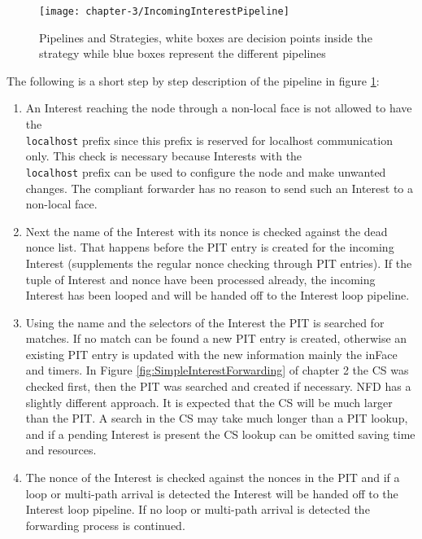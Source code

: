 \vspace{5mm} %

\begin{figure}[H]
  \centering
  \texttt{[image: chapter-3/IncomingInterestPipeline]}
  \caption{Pipelines and Strategies, white boxes are decision points inside the strategy while blue boxes represent the different pipelines \cite{Afanasyev16}}
  \label{fig:IncomingInterestPipeline}
\end{figure}

\vspace{5mm} %

The following is a short step by step description of the pipeline in figure  \ref{fig:IncomingInterestPipeline}:

\begin{enumerate}
\item An Interest reaching the node through a non-local face is not allowed to have the \texttt{\\localhost} prefix since this prefix is reserved for localhost communication only. This check is necessary because Interests with the \texttt{\\localhost} prefix can be used to configure the node and make unwanted changes. The compliant forwarder has no reason to send such an Interest to a non-local face.
\item Next the name of the Interest with its nonce is checked against the dead nonce list. That happens before the PIT entry is created for the incoming Interest (supplements the regular nonce checking through PIT entries). If the tuple of Interest and nonce have been processed already, the incoming Interest has been looped and will be handed off to the Interest loop pipeline.
\item Using the name and the selectors of the Interest the PIT is searched for matches. If no match can be found a new PIT entry is created, otherwise an existing PIT entry is updated with the new information mainly the inFace and timers. In Figure \ref{fig:SimpleInterestForwarding} of chapter 2 the CS was checked first, then the PIT was searched and created if necessary. NFD has a slightly different approach. It is expected that the CS will be much larger than the PIT. A search in the CS may take much longer than a PIT lookup, and if a pending Interest is present the CS lookup can be omitted saving time and resources.
\item The nonce of the Interest is checked against the nonces in the PIT and if a loop or multi-path arrival is detected the Interest will be handed off to the Interest loop pipeline. If no loop or multi-path arrival is detected the forwarding process is continued.

\end{enumerate}
